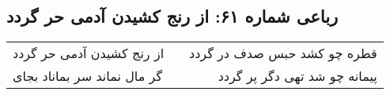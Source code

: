 \begin{center}
\section*{رباعی شماره ۶۱: از رنج کشیدن آدمی حر گردد}
\label{sec:sh061}
\begin{longtable}{l p{0.5cm} r}
از رنج کشیدن آدمی حر گردد
&&
قطره چو کشد حبس صدف در گردد
\\
گر مال نماند سر بماناد بجای
&&
پیمانه چو شد تهی دگر پر گردد
\\
\end{longtable}
\end{center}
